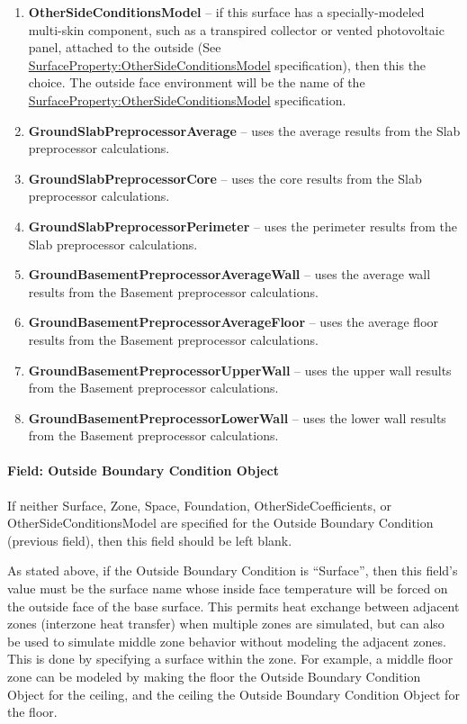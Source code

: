 \begin{enumerate}
  \item
    \textbf{OtherSideConditionsModel} -- if this surface has a specially-modeled multi-skin component, such as a transpired collector or vented photovoltaic panel, attached to the outside (See \hyperref[surfacepropertyothersideconditionsmodel]{SurfaceProperty:OtherSideConditionsModel} specification), then this the choice. The outside face environment will be the name of the \hyperref[surfacepropertyothersideconditionsmodel]{SurfaceProperty:OtherSideConditionsModel} specification.
  \item
    \textbf{GroundSlabPreprocessorAverage} -- uses the average results from the Slab preprocessor calculations.
  \item
    \textbf{GroundSlabPreprocessorCore} -- uses the core results from the Slab preprocessor calculations.
  \item
    \textbf{GroundSlabPreprocessorPerimeter} -- uses the perimeter results from the Slab preprocessor calculations.
  \item
    \textbf{GroundBasementPreprocessorAverageWall} -- uses the average wall results from the Basement preprocessor calculations.
  \item
    \textbf{GroundBasementPreprocessorAverageFloor} -- uses the average floor results from the Basement preprocessor calculations.
  \item
    \textbf{GroundBasementPreprocessorUpperWall} -- uses the upper wall results from the Basement preprocessor calculations.
  \item
    \textbf{GroundBasementPreprocessorLowerWall} -- uses the lower wall results from the Basement preprocessor calculations.
\end{enumerate}

\paragraph{Field: Outside Boundary Condition Object}\label{field-outside-boundary-condition-object-7}

If neither Surface, Zone, Space, Foundation, OtherSideCoefficients, or OtherSideConditionsModel are specified for the Outside Boundary Condition (previous field), then this field should be left blank.

As stated above, if the Outside Boundary Condition is ``Surface'', then this field's value must be the surface name whose inside face temperature will be forced on the outside face of the base surface. This permits heat exchange between adjacent zones (interzone heat transfer) when multiple zones are simulated, but can also be used to simulate middle zone behavior without modeling the adjacent zones. This is done by specifying a surface within the zone. For example, a middle floor zone can be modeled by making the floor the Outside Boundary Condition Object for the ceiling, and the ceiling the Outside Boundary Condition Object for the floor.

